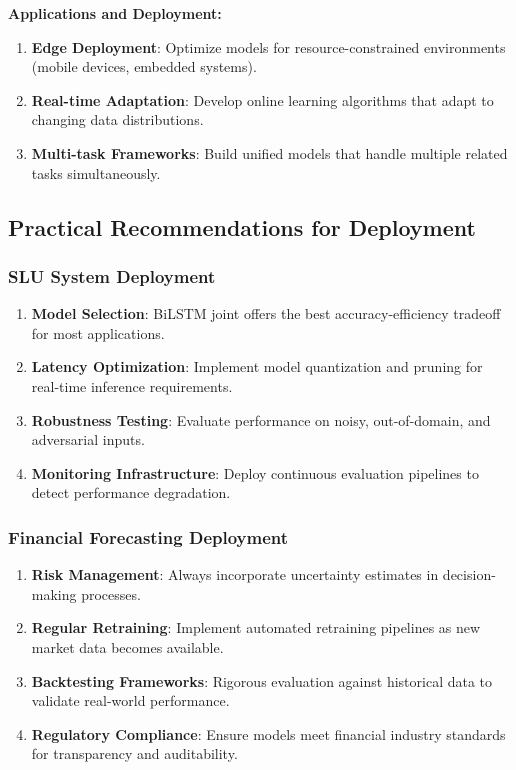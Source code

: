\documentclass[conference]{IEEEtran}
\begin{document}
\textbf{Applications and Deployment:}
\begin{enumerate}
  \item \textbf{Edge Deployment}: Optimize models for resource-constrained environments (mobile devices, embedded systems).

  \item \textbf{Real-time Adaptation}: Develop online learning algorithms that adapt to changing data distributions.

  \item \textbf{Multi-task Frameworks}: Build unified models that handle multiple related tasks simultaneously.
\end{enumerate}

\subsection{Practical Recommendations for Deployment}

\subsubsection{SLU System Deployment}
\begin{enumerate}
  \item \textbf{Model Selection}: BiLSTM joint offers the best accuracy-efficiency tradeoff for most applications.

  \item \textbf{Latency Optimization}: Implement model quantization and pruning for real-time inference requirements.

  \item \textbf{Robustness Testing}: Evaluate performance on noisy, out-of-domain, and adversarial inputs.

  \item \textbf{Monitoring Infrastructure}: Deploy continuous evaluation pipelines to detect performance degradation.
\end{enumerate}

\subsubsection{Financial Forecasting Deployment}
\begin{enumerate}
  \item \textbf{Risk Management}: Always incorporate uncertainty estimates in decision-making processes.

  \item \textbf{Regular Retraining}: Implement automated retraining pipelines as new market data becomes available.

  \item \textbf{Backtesting Frameworks}: Rigorous evaluation against historical data to validate real-world performance.

  \item \textbf{Regulatory Compliance}: Ensure models meet financial industry standards for transparency and auditability.
\end{enumerate}
\end{document}
